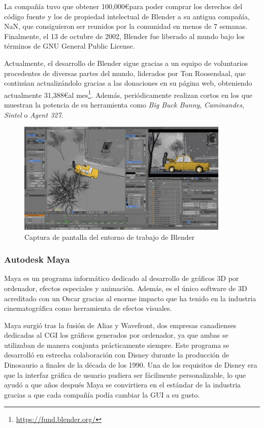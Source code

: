 La compañía tuvo que obtener 100,000\euro para poder comprar los derechos del código fuente y los de propiedad intelectual de Blender a su antigua compañía, NaN, que consiguieron ser reunidos por la comunidad en menos de 7 semanas. Finalmente, el 13 de octubre de 2002, Blender fue liberado al mundo bajo los términos de GNU General Public License. 

Actualmente, el desarrollo de Blender sigue gracias a un equipo de voluntarios procedentes de diversas partes del mundo, liderados por Ton Roosendaal, que continúan actualizándolo gracias a las donaciones en su página web, obteniendo actualmente 31,388\euro al mes\footnote{\url{https://fund.blender.org/}}. Además, periódicamente realizan cortos en los que muestran la potencia de su herramienta como \textit{Big Buck Bunny}, \textit{Caminandes}, \textit{Sintel} o \textit{Agent 327}.

\begin{figure}[!h]
\begin{center}
\includegraphics[width=0.9\textwidth]{imagenes/2/blender.jpg}
\caption{Captura de pantalla del entorno de trabajo de Blender}
\label{fig:blender}
\end{center}
\end{figure}

\subsubsection{Autodesk Maya}

Maya es un programa informático dedicado al desarrollo de gráficos 3D por ordenador, efectos especiales y animación. Además, es el único software de 3D acreditado con un Oscar gracias al enorme impacto que ha tenido en la industria cinematográfica como herramienta de efectos visuales.

Maya surgió tras la fusión de Alias y Wavefront, dos empresas canadienses dedicadas al \acs{CGI} los gráficos generados por ordenador, ya que ambas se utilizaban de manera conjunta prácticamente siempre. Este programa se desarrolló en estrecha colaboración con Disney durante la producción de Dinosaurio a finales de la década de los 1990. Una de los requisitos de Disney era que la interfaz gráfica de usuario pudiera ser fácilmente personalizable, lo que ayudó a que años después Maya se convirtiera en el estándar de la industria gracias a que cada compañía podía cambiar la \acs{GUI} a su gusto.

